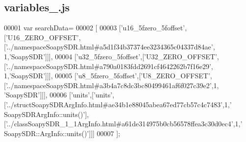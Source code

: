 \subsection{variables\+\_.\+js}
\label{variables__8_8js_source}

\begin{DoxyCode}
00001 var searchData=
00002 [
00003   [\textcolor{stringliteral}{'u16\_5fzero\_5foffset'},[\textcolor{stringliteral}{'U16\_ZERO\_OFFSET'},[\textcolor{stringliteral}{'../namespaceSoapySDR.html#a5d1f34b37374ee3234365c04337d84ae'},
      1,\textcolor{stringliteral}{'SoapySDR'}]]],
00004   [\textcolor{stringliteral}{'u32\_5fzero\_5foffset'},[\textcolor{stringliteral}{'U32\_ZERO\_OFFSET'},[\textcolor{stringliteral}{'../namespaceSoapySDR.html#a790a0183fdd2691cf4642262b7f16e29'},
      1,\textcolor{stringliteral}{'SoapySDR'}]]],
00005   [\textcolor{stringliteral}{'u8\_5fzero\_5foffset'},[\textcolor{stringliteral}{'U8\_ZERO\_OFFSET'},[\textcolor{stringliteral}{'../namespaceSoapySDR.html#a3b4a7c8dc3bc80499461af6f027c39e2'},1,\textcolor{stringliteral}{
      'SoapySDR'}]]],
00006   [\textcolor{stringliteral}{'units'},[\textcolor{stringliteral}{'units'},[\textcolor{stringliteral}{'../structSoapySDRArgInfo.html#ae34b1e88045abea67ed77cb57c4c7483'},1,\textcolor{stringliteral}{'
      SoapySDRArgInfo::units()'}],[\textcolor{stringliteral}{'../classSoapySDR\_1\_1ArgInfo.html#a61de314975b0cb56578ffea3c30d0ec4'},1,\textcolor{stringliteral}{'
      SoapySDR::ArgInfo::units()'}]]]
00007 ];
\end{DoxyCode}
